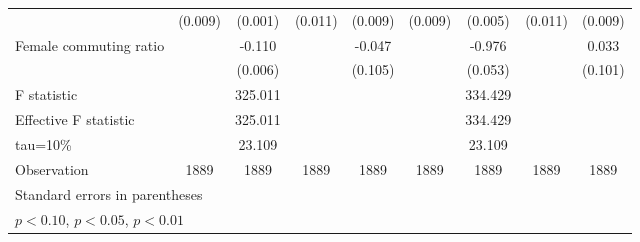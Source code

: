 \begin{tabular}{l*{8}{c}}
                    &     (0.009)         &     (0.001)         &     (0.011)         &     (0.009)         &     (0.009)         &     (0.005)         &     (0.011)         &     (0.009)         \\
\addlinespace
Female commuting ratio&                     &      -0.110\sym{***}&                     &      -0.047         &                     &      -0.976\sym{***}&                     &       0.033         \\
                    &                     &     (0.006)         &                     &     (0.105)         &                     &     (0.053)         &                     &     (0.101)         \\
\hline
F statistic         &                     &     325.011         &                     &                     &                     &     334.429         &                     &                     \\
Effective F statistic&                     &     325.011         &                     &                     &                     &     334.429         &                     &                     \\
tau=10\%            &                     &      23.109         &                     &                     &                     &      23.109         &                     &                     \\
Observation         &        1889         &        1889         &        1889         &        1889         &        1889         &        1889         &        1889         &        1889         \\
\bottomrule \multicolumn{9}{l}{\footnotesize Standard errors in parentheses}\\ \multicolumn{8}{l}{\footnotesize \sym{*} \(p<0.10\), \sym{**} \(p<0.05\), \sym{***} \(p<0.01\)} \end{tabular}
